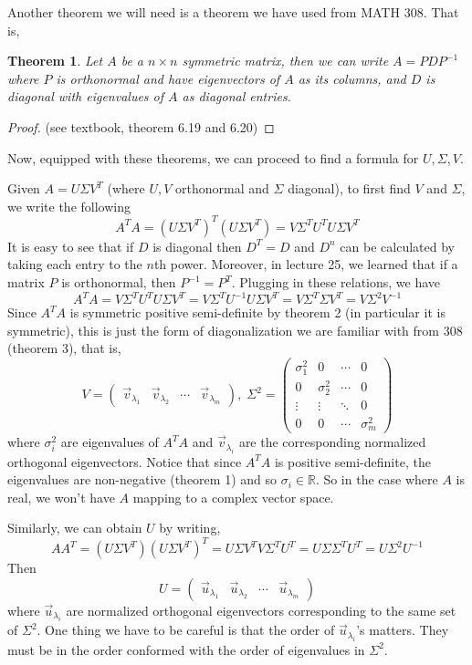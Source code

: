 \documentclass{article}
\newtheorem{theorem}{Theorem}
\begin{document}
Another theorem we will need is a theorem we have used from MATH 308. That is, 
\bigskip

\begin{theorem} Let $A$ be a $n \times n $ symmetric matrix, then we can write $A= P D P^{-1}$ where $P$ is orthonormal and have eigenvectors of $A$ as its columns, and $D$ is diagonal with eigenvalues of $A$ as diagonal entries.
\end{theorem}

\begin{proof}
(see textbook, theorem 6.19 and 6.20)
\end{proof}
\bigskip 

Now, equipped with these theorems, we can proceed to find a formula for $U, \Sigma, V$. 
\bigskip

Given $A= U \Sigma V^T$ (where $U,V$ orthonormal and $\Sigma$ diagonal), to first find $V$ and $\Sigma$, we write the following 
$$A^TA = ( U \Sigma V^T)^T ( U \Sigma V^T) = V \Sigma^T U^T U \Sigma V^T$$
It is easy to see that if $D$ is diagonal then $D^T = D$ and $D^n$ can be calculated by taking each entry to the $n$th power. Moreover, in lecture 25, we learned that if a matrix $P$ is orthonormal, then $P^{-1} = P^T$. Plugging in these relations, we have 
$$A^TA =V \Sigma^T U^T U \Sigma V^T = V \Sigma^T U^{-1} U \Sigma V^T =V \Sigma^T  \Sigma V^T = V \Sigma^2 V^{-1}$$
Since $A^TA$ is symmetric positive semi-definite by theorem 2 (in particular it is symmetric), this is just the form of diagonalization we are familiar with from 308 (theorem 3), that is, $$V = \begin{pmatrix} \vec{v}_{\lambda_1} & \vec{v}_{\lambda_2} & \cdots & \vec{v}_{\lambda_m} \end{pmatrix}, \; \Sigma^2 = \begin{pmatrix} \sigma^2_1 & 0&  \cdots & 0 \\ 0& \sigma^2_2 &\cdots & 0 \\ \vdots & \vdots & \ddots &0 \\
0 &0& \cdots & \sigma^2_m  \end{pmatrix}$$ 
where $\sigma^2_i$ are eigenvalues of $A^TA$ and $\vec{v}_{\lambda_i}$ are the corresponding normalized orthogonal eigenvectors. Notice that since $A^TA$ is positive semi-definite, the eigenvalues are non-negative (theorem 1) and so $\sigma_i \in \mathbb{R}$. So in the case where $A$ is real, we won't have $A$ mapping to a complex vector space. 
\bigskip

Similarly, we can obtain $U$ by writing,
$$AA^T = (U \Sigma V^T)(U \Sigma V^T)^T = U \Sigma V^T V \Sigma^TU^T = U \Sigma  \Sigma^TU^T = U  \Sigma^2U^{-1}$$
Then 
$$U = \begin{pmatrix} \vec{u}_{\lambda_1} & \vec{u}_{\lambda_2} & \cdots & \vec{u}_{\lambda_m} \end{pmatrix}$$ 
where $\vec{u}_{\lambda_i}$ are normalized orthogonal eigenvectors corresponding to the same set of $\Sigma^2$. One thing we have to be careful is that the order of $\vec{u}_{\lambda_i}$'s matters. They must be in the order conformed with the order of eigenvalues in $\Sigma^2$.
\end{document}
